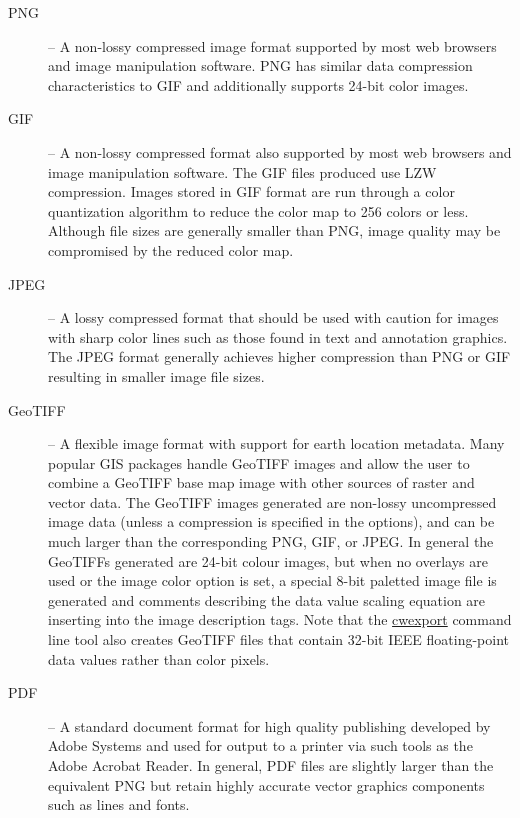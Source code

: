 \begin{description}

\item[PNG] -- A non-lossy compressed image format supported by
most web browsers and image manipulation software. PNG has
similar data compression characteristics to GIF and additionally
supports 24-bit color images.

\item[GIF] -- A non-lossy compressed format also supported by most
web browsers and image manipulation software. The GIF files
produced use LZW compression. Images stored in GIF format are run
through a color quantization algorithm to reduce the color map to
256 colors or less. Although file sizes are generally smaller
than PNG, image quality may be compromised by the reduced color
map.

\item[JPEG] -- A lossy compressed format that should be used with
caution for images with sharp color lines such as those found in
text and annotation graphics. The JPEG format generally achieves
higher compression than PNG or GIF resulting in smaller image
file sizes.

\item[GeoTIFF] -- A flexible image format with support for earth
location metadata. Many popular GIS packages handle GeoTIFF
images and allow the user to combine a GeoTIFF base map image
with other sources of raster and vector data. The GeoTIFF images
generated are non-lossy uncompressed image data (unless a
compression is specified in the options), and can be much larger
than the corresponding PNG, GIF, or JPEG. In general the GeoTIFFs
generated are 24-bit colour images, but when no overlays are used
or the image color option is set, a special 8-bit paletted image
file is generated and comments describing the data value scaling
equation are inserting into the image description tags. Note that
the \hyperlink{cwexport}{cwexport} command line tool also creates
GeoTIFF files that contain 32-bit IEEE floating-point data values
rather than color pixels.

\item[PDF] -- A standard document format for high quality
publishing developed by Adobe Systems and used for output to a
printer via such tools as the Adobe Acrobat Reader. In general,
PDF files are slightly larger than the equivalent PNG but retain
highly accurate vector graphics components such as lines and
fonts.

\end{description}

